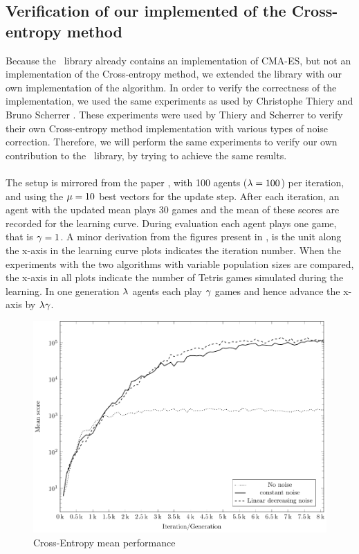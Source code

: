 \subsection{Verification of our implemented of the Cross-entropy method \label{varifyofce}}

Because the \shark\ library already contains an implementation of 
CMA-ES, but not an implementation of the Cross-entropy method, we extended the library
with our own implementation of the algorithm.
In order to verify the correctness of the implementation, 
we used the same experiments as used by 
Christophe Thiery and Bruno Scherrer \citep{thiery:09}. 
These experiments were used by Thiery and Scherrer to 
verify their own Cross-entropy method implementation with various types of noise correction. 
Therefore, we will perform the same experiments to verify our 
own contribution to the \shark\  library, by trying to achieve the same results.\\
\\
The setup is mirrored from the paper \citep{thiery:09}, 
with 100 agents ($\lambda = 100$) per iteration,
and using the $\mu = 10$ best vectors
for the update step. After each iteration, 
an agent with the updated mean 
plays 30 games and the mean of these scores are recorded for the
learning curve.
During evaluation each agent plays one game, that is $\gamma = 1$.
A minor derivation from the figures present in \citep{thiery:09}, is 
the unit along the x-axis in the learning curve plots indicates 
the iteration number. When the experiments with the two algorithms
with variable population sizes are compared, the x-axis in all plots
indicate the number of Tetris games simulated during the learning. In one 
generation $\lambda$ agents each play $\gamma$ games and hence
advance the x-axis by $\lambda \gamma$.\\

\begin{figure}[H]
\begin{center}
\includegraphics[scale=0.8]{plots/meansPlot}
\end{center}
\caption{Cross-Entropy mean performance \label{fig:cemean}}
\end{figure}

